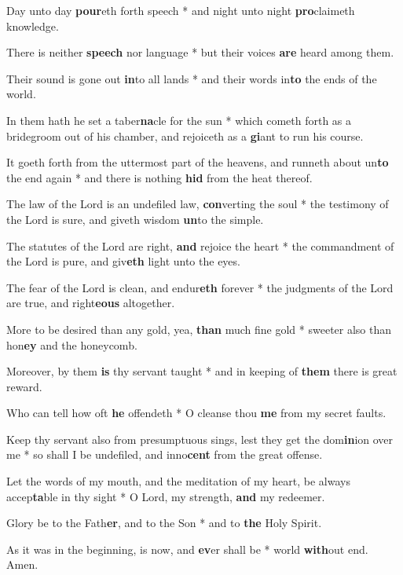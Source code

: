 \begin{multicols}{2}
	Day unto day \textbf{pour}eth forth speech * and night unto night \textbf{pro}claimeth knowledge.
	
	There is neither \textbf{speech} nor language * but their voices \textbf{are} heard among them.
	
	Their sound is gone out \textbf{in}to all lands * and their words in\textbf{to} the ends of the world.
	
	In them hath he set a taber\textbf{na}cle for the sun * which cometh forth as a bridegroom out of his chamber, and rejoiceth as a \textbf{gi}ant to run his course.
	
	It goeth forth from the uttermost part of the heavens, and runneth about un\textbf{to} the end again * and there is nothing \textbf{hid} from the heat thereof.
	
	The law of the Lord is an undefiled law, \textbf{con}verting the soul * the testimony of the Lord is sure, and giveth wisdom \textbf{un}to the simple.
	
	The statutes of the Lord are right, \textbf{and} rejoice the heart * the commandment of the Lord is pure, and giv\textbf{eth} light unto the eyes.
	
	The fear of the Lord is clean, and endur\textbf{eth} forever * the judgments of the Lord are true, and right\textbf{eous} altogether.
	
	More to be desired than any gold, yea, \textbf{than} much fine gold * sweeter also than hon\textbf{ey} and the honeycomb.
	
	Moreover, by them \textbf{is} thy servant taught * and in keeping of \textbf{them} there is great reward.
	
	Who can tell how oft \textbf{he} offendeth * O cleanse thou \textbf{me} from my secret faults.
	
	Keep thy servant also from presumptuous sings, lest they get the dom\textbf{in}ion over me * so shall I be undefiled, and inno\textbf{cent} from the great offense.
	
	Let the words of my mouth, and the meditation of my heart, be always accep\textbf{ta}ble in thy sight * O Lord, my strength, \textbf{and} my redeemer.
	
	Glory be to the Fath\textbf{er}, and to the Son * and to \textbf{the} Holy Spirit.
	
	As it was in the beginning, is now, and \textbf{ev}er shall be * world \textbf{with}out end. Amen.
\end{multicols}